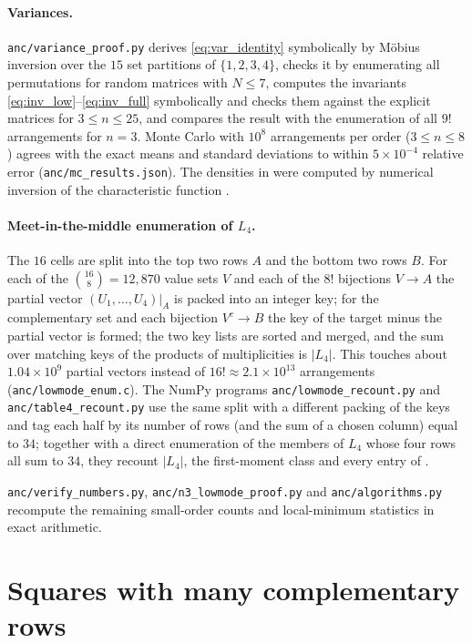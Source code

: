 \paragraph{Variances.}
\texttt{anc/variance\_proof.py} derives \eqref{eq:var_identity} symbolically by M\"obius inversion over the $15$ set partitions of $\{1,2,3,4\}$, checks it by enumerating all permutations for random matrices with $N\le7$, computes the invariants \eqref{eq:inv_low}--\eqref{eq:inv_full} symbolically and checks them against the explicit matrices for $3\le n\le25$, and compares the result with the enumeration of all $9!$ arrangements for $n=3$.
Monte Carlo with $10^8$ arrangements per order ($3\le n\le8$) agrees with the exact means and standard deviations to within $5\times10^{-4}$ relative error (\texttt{anc/mc\_results.json}).
The densities in  were computed by numerical inversion of the characteristic function \cite{imhof1961}.

\paragraph{Meet-in-the-middle enumeration of $L_4$.}
The $16$ cells are split into the top two rows $A$ and the bottom two rows $B$.
For each of the $\binom{16}{8}=12{,}870$ value sets $V$ and each of the $8!$ bijections $V\to A$ the partial vector $(U_1,\dots,U_4)|_A$ is packed into an integer key; for the complementary set and each bijection $V^c\to B$ the key of the target minus the partial vector is formed; the two key lists are sorted and merged, and the sum over matching keys of the products of multiplicities is $|L_4|$.
This touches about $1.04\times10^9$ partial vectors instead of $16!\approx2.1\times10^{13}$ arrangements (\texttt{anc/lowmode\_enum.c}).
The NumPy programs \texttt{anc/lowmode\_recount.py} and \texttt{anc/table4\_recount.py} use the same split with a different packing of the keys and tag each half by its number of rows (and the sum of a chosen column) equal to $34$; together with a direct enumeration of the members of $L_4$ whose four rows all sum to $34$, they recount $|L_4|$, the first-moment class and every entry of .

\texttt{anc/verify\_numbers.py}, \texttt{anc/n3\_lowmode\_proof.py} and \texttt{anc/algorithms.py} recompute the remaining small-order counts and local-minimum statistics in exact arithmetic.

\section{Squares with many complementary rows}
\label{sec:app_twin}

